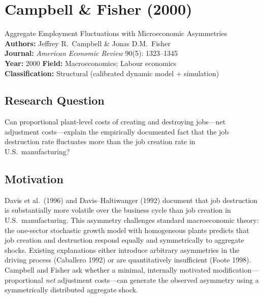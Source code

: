 \chapter{Campbell \& Fisher (2000)}

\begin{paperbox}{Aggregate Employment Fluctuations with Microeconomic Asymmetries}
\textbf{Authors:} Jeffrey R.\ Campbell \& Jonas D.M.\ Fisher\\[3pt]
\textbf{Journal:} \textit{American Economic Review} 90(5): 1323--1345\\[3pt]
\textbf{Year:} 2000 \quad\textbf{Field:} Macroeconomics; Labour economics\\[3pt]
\textbf{Classification:} Structural (calibrated dynamic model + simulation)
\end{paperbox}

\section{Research Question}

Can proportional plant-level costs of creating and destroying jobs---net
adjustment costs---explain the empirically documented fact that the job
destruction rate fluctuates more than the job creation rate in U.S.\
manufacturing?

\section{Motivation}

Davis et al.\ (1996) and Davis--Haltiwanger (1992) document that job
destruction is substantially more volatile over the business cycle than job
creation in U.S.\ manufacturing. This asymmetry challenges standard
macroeconomic theory: the one-sector stochastic growth model with homogeneous
plants predicts that job creation and destruction respond equally and
symmetrically to aggregate shocks. Existing explanations either introduce
arbitrary asymmetries in the driving process (Caballero 1992) or are
quantitatively insufficient (Foote 1998). Campbell and Fisher ask whether a
minimal, internally motivated modification---proportional \emph{net} adjustment
costs---can generate the observed asymmetry using a symmetrically distributed
aggregate shock.

